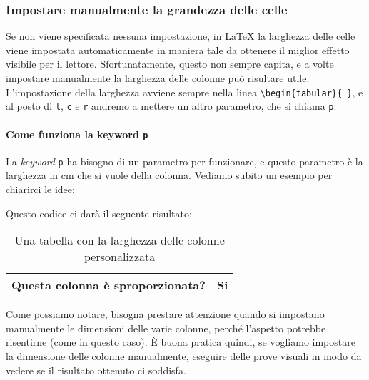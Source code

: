 \subsubsection{Impostare manualmente la grandezza delle celle}

Se non viene specificata nessuna impostazione, in \LaTeX{} la larghezza delle
celle viene impostata automaticamente in maniera tale da ottenere il miglior
effetto visibile per il lettore. Sfortunatamente, questo non sempre capita, e a
volte impostare manualmente la larghezza delle colonne può risultare utile.
L'impostazione della larghezza avviene sempre nella linea
\verb!\begin{tabular}{ }!, e al posto di \texttt{l}, \texttt{c} e \texttt{r}
andremo a mettere un altro parametro, che si chiama \texttt{p}.

\paragraph*{Come funziona la keyword \texttt{p}} La \textit{keyword} \texttt{p}
ha bisogno di un parametro per funzionare, e questo parametro è la larghezza in
cm che si vuole della colonna. Vediamo subito un esempio per chiarirci le idee:

\vspace{\abovedisplayskip}
\begin{minipage}{\linewidth}
  
\end{minipage}
\vspace{\belowdisplayskip}

\noindent Questo codice ci darà il seguente risultato:

\begin{table}[H]
\centering
\begin{tabular}{|p{2cm}|p{10cm}|}
\hline
Questa colonna è sproporzionata? & Si \\ \hline
\end{tabular}
\caption{Una tabella con la larghezza delle colonne personalizzata}
\label{tab:es_spoporzionata}
\end{table}

\noindent Come possiamo notare, bisogna prestare attenzione quando si impostano
manualmente le dimensioni delle varie colonne, perché l'aspetto potrebbe
risentirne (come in questo caso). È buona pratica quindi, se vogliamo impostare
la dimensione delle colonne manualmente, eseguire delle prove visuali in modo
da vedere se il risultato ottenuto ci soddisfa.
